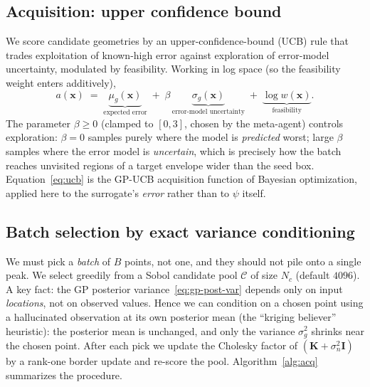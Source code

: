 \documentclass[11pt]{article}
\newcommand{\x}{\bm{x}}
\newcommand{\Kmat}{\bm{K}}
\newcommand{\Imat}{\bm{I}}
\begin{document}
\subsection{Acquisition: upper confidence bound}

We score candidate geometries by an upper-confidence-bound (UCB) rule that
trades exploitation of known-high error against exploration of error-model
uncertainty, modulated by feasibility. Working in log space (so the feasibility
weight enters additively),
\begin{equation}
  \boxed{\;\;
  a(\x) \;=\; \underbrace{\mu_g(\x)}_{\text{expected error}}
  \;+\; \beta\,\underbrace{\sigma_g(\x)}_{\text{error-model uncertainty}}
  \;+\; \underbrace{\log w(\x)}_{\text{feasibility}} .
  \;\;}
  \label{eq:ucb}
\end{equation}
The parameter $\beta\ge0$ (clamped to $[0,3]$, chosen by the meta-agent)
controls exploration: $\beta=0$ samples purely where the model is
\emph{predicted} worst; large $\beta$ samples where the error model is
\emph{uncertain}, which is precisely how the batch reaches unvisited regions of
a target envelope wider than the seed box. Equation~\eqref{eq:ucb} is the
GP-UCB acquisition function of Bayesian optimization, applied here to the
surrogate's \emph{error} rather than to $\psi$ itself.

\subsection{Batch selection by exact variance conditioning}

We must pick a \emph{batch} of $B$ points, not one, and they should not pile
onto a single peak. We select greedily from a Sobol candidate pool
$\mathcal{C}$ of size $N_c$ (default $4096$). A key fact: the GP posterior
variance~\eqref{eq:gp-post-var} depends only on input \emph{locations}, not on
observed values. Hence we can condition on a chosen point using a hallucinated
observation at its own posterior mean (the ``kriging believer'' heuristic):
the posterior mean is unchanged, and only the variance $\sigma_g^2$ shrinks near
the chosen point. After each pick we update the Cholesky factor of
$(\Kmat+\sigma_n^2\Imat)$ by a rank-one border update and re-score the pool.
Algorithm~\ref{alg:acq} summarizes the procedure.
\end{document}
